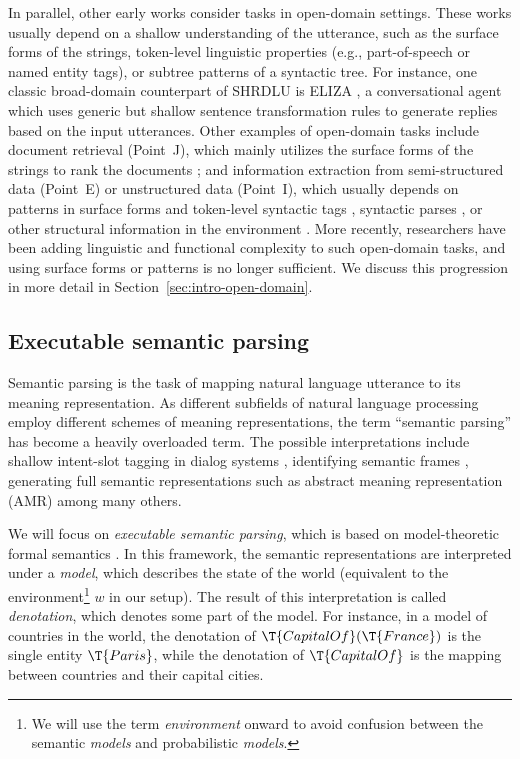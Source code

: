 In parallel, other early works
consider tasks in open-domain settings.
These works usually depend on
a shallow understanding of the utterance,
such as the surface forms of the strings,
token-level linguistic properties (e.g., part-of-speech
or named entity tags),
or subtree patterns of a syntactic tree.
For instance,
one classic broad-domain counterpart of SHRDLU is
ELIZA \cite{weizenbaum1966eliza},
a conversational agent
which uses generic but shallow sentence transformation rules
to generate replies based on the input utterances.
Other examples of open-domain tasks include
document retrieval (Point~J),
which mainly utilizes the surface forms of the strings
to rank the documents \cite{robertson2009probabilistic};
and information extraction
from semi-structured data (Point~E)
or unstructured data (Point~I),
which usually depends on patterns in
surface forms and
token-level syntactic tags \cite{hearst1992automatic,agichtein2000snowball},
syntactic parses \cite{mintz2009distant},
or other structural information
in the environment \cite{kushmerick1997wrapper,muslea2001hierarchical,arasu2003extracting}.
More recently, researchers have been
adding linguistic and functional complexity to
such open-domain tasks,
and using surface forms or patterns is no longer sufficient.
We discuss this progression in more detail
in Section~\ref{sec:intro-open-domain}.

\subsection{Executable semantic parsing}
\label{sec:intro-semantic-parsing}

Semantic parsing is the task of mapping
natural language utterance to its
meaning representation.
As different subfields of natural language processing
employ different schemes of meaning representations,
the term ``semantic parsing''
has become a heavily overloaded term.
The possible interpretations include
shallow intent-slot tagging in dialog systems
\cite{pieraccini1991stochastic,raymond2007generative,mesnil2014using},
identifying semantic frames \cite{gildea02semantic,hermann2014semantic},
generating full semantic representations
such as abstract meaning representation (AMR) \cite{banarescu2013amr,flanigan2014discriminative,wang2015transition,artzi2015broad}
among many others.

We will focus on \emph{executable semantic parsing},
which is based on
model-theoretic formal semantics \cite{montague73ptq}.
In this framework,
the semantic representations are interpreted under
a \emph{model}, which describes the state of the world
(equivalent to the environment\footnote{
We will use the term \emph{environment} onward to avoid
confusion between the semantic \emph{models}
and probabilistic \emph{models}.
} $w$ in our setup).
The result of this interpretation is called \emph{denotation},
which denotes some part of the model.
For instance,
in a model of countries in the world,
the denotation of $\T{CapitalOf}(\T{France})$
is the single entity $\T{Paris}$,
while the denotation of $\T{CapitalOf}$
is the mapping between countries and their capital cities.

